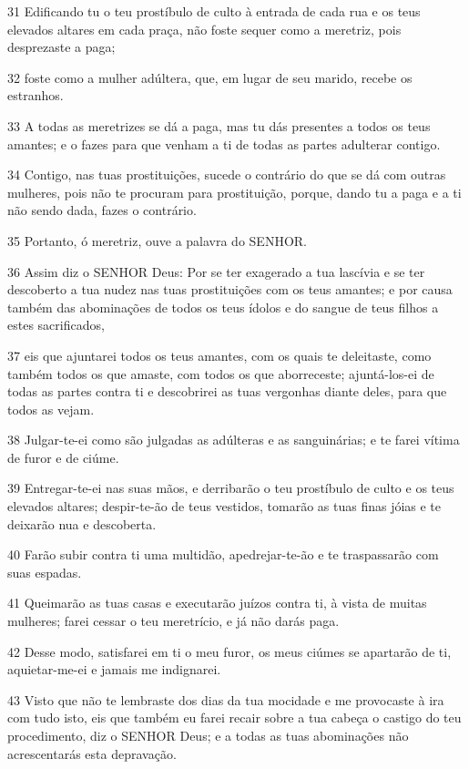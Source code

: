 \par 31 Edificando tu o teu prostíbulo de culto à entrada de cada rua e os teus elevados altares em cada praça, não foste sequer como a meretriz, pois desprezaste a paga;
\par 32 foste como a mulher adúltera, que, em lugar de seu marido, recebe os estranhos.
\par 33 A todas as meretrizes se dá a paga, mas tu dás presentes a todos os teus amantes; e o fazes para que venham a ti de todas as partes adulterar contigo.
\par 34 Contigo, nas tuas prostituições, sucede o contrário do que se dá com outras mulheres, pois não te procuram para prostituição, porque, dando tu a paga e a ti não sendo dada, fazes o contrário.
\par 35 Portanto, ó meretriz, ouve a palavra do SENHOR.
\par 36 Assim diz o SENHOR Deus: Por se ter exagerado a tua lascívia e se ter descoberto a tua nudez nas tuas prostituições com os teus amantes; e por causa também das abominações de todos os teus ídolos e do sangue de teus filhos a estes sacrificados,
\par 37 eis que ajuntarei todos os teus amantes, com os quais te deleitaste, como também todos os que amaste, com todos os que aborreceste; ajuntá-los-ei de todas as partes contra ti e descobrirei as tuas vergonhas diante deles, para que todos as vejam.
\par 38 Julgar-te-ei como são julgadas as adúlteras e as sanguinárias; e te farei vítima de furor e de ciúme.
\par 39 Entregar-te-ei nas suas mãos, e derribarão o teu prostíbulo de culto e os teus elevados altares; despir-te-ão de teus vestidos, tomarão as tuas finas jóias e te deixarão nua e descoberta.
\par 40 Farão subir contra ti uma multidão, apedrejar-te-ão e te traspassarão com suas espadas.
\par 41 Queimarão as tuas casas e executarão juízos contra ti, à vista de muitas mulheres; farei cessar o teu meretrício, e já não darás paga.
\par 42 Desse modo, satisfarei em ti o meu furor, os meus ciúmes se apartarão de ti, aquietar-me-ei e jamais me indignarei.
\par 43 Visto que não te lembraste dos dias da tua mocidade e me provocaste à ira com tudo isto, eis que também eu farei recair sobre a tua cabeça o castigo do teu procedimento, diz o SENHOR Deus; e a todas as tuas abominações não acrescentarás esta depravação.
